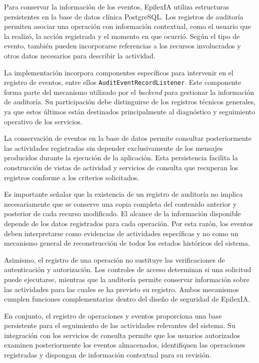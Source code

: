 Para conservar la información de los eventos, EpilexIA utiliza estructuras persistentes en la base de datos clínica PostgreSQL. Los registros de auditoría permiten asociar una operación con información contextual, como el usuario que la realizó, la acción registrada y el momento en que ocurrió. Según el tipo de evento, también pueden incorporarse referencias a los recursos involucrados y otros datos necesarios para describir la actividad.

La implementación incorpora componentes específicos para intervenir en el registro de eventos, entre ellos \texttt{AuditEventRecordListener}. Este componente forma parte del mecanismo utilizado por el \textit{backend} para gestionar la información de auditoría. Su participación debe distinguirse de los registros técnicos generales, ya que estos últimos están destinados principalmente al diagnóstico y seguimiento operativo de los servicios.

La conservación de eventos en la base de datos permite consultar posteriormente las actividades registradas sin depender exclusivamente de los mensajes producidos durante la ejecución de la aplicación. Esta persistencia facilita la construcción de vistas de actividad y servicios de consulta que recuperan los registros conforme a los criterios solicitados.

Es importante señalar que la existencia de un registro de auditoría no implica necesariamente que se conserve una copia completa del contenido anterior y posterior de cada recurso modificado. El alcance de la información disponible depende de los datos registrados para cada operación. Por esta razón, los eventos deben interpretarse como evidencias de actividades específicas y no como un mecanismo general de reconstrucción de todos los estados históricos del sistema.

Asimismo, el registro de una operación no sustituye las verificaciones de autenticación y autorización. Los controles de acceso determinan si una solicitud puede ejecutarse, mientras que la auditoría permite conservar información sobre las actividades para las cuales se ha previsto su registro. Ambos mecanismos cumplen funciones complementarias dentro del diseño de seguridad de EpilexIA.

En conjunto, el registro de operaciones y eventos proporciona una base persistente para el seguimiento de las actividades relevantes del sistema. Su integración con los servicios de consulta permite que los usuarios autorizados examinen posteriormente los eventos almacenados, identifiquen las operaciones registradas y dispongan de información contextual para su revisión.


